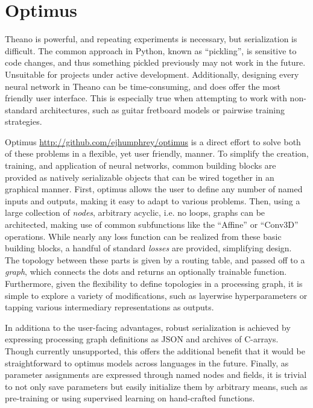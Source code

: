 \section{Optimus}
\label{sec:optimus}

Theano is powerful, and repeating experiments is necessary, but serialization is difficult.
The common approach in Python, known as ``pickling'', is sensitive to code changes, and thus something pickled previously may not work in the future.
Unsuitable for projects under active development.
Additionally, designing every neural network in Theano can be time-consuming, and does offer the most friendly user interface.
This is especially true when attempting to work with non-standard architectures, such as guitar fretboard models or pairwise training strategies.

Optimus \url{http://github.com/ejhumphrey/optimus} is a direct effort to solve both of these problems in a flexible, yet user friendly, manner.
To simplify the creation, training, and application of neural networks, common building blocks are provided as natively serializable objects that can be wired together in an graphical manner.
First, optimus allows the user to define any number of named inputs and outputs, making it easy to adapt to various problems.
Then, using a large collection of \emph{nodes}, arbitrary acyclic, i.e. no loops, graphs can be architected, making use of common subfunctions like the ``Affine'' or ``Conv3D'' operations.
While nearly any loss function can be realized from these basic building blocks, a handful of standard \emph{losses} are provided, simplifying design.
The topology between these parts is given by a routing table, and passed off to a \emph{graph}, which connects the dots and returns an optionally trainable function.
Furthermore, given the flexibility to define topologies in a processing graph, it is simple to explore a variety of modifications, such as layerwise hyperparameters or tapping various intermediary representations as outputs.

In additiona to the user-facing advantages, robust serialization is achieved by expressing processing graph definitions as JSON and archives of C-arrays.
Though currently unsupported, this offers the additional benefit that it would be straightforward to optimus models across languages in the future.
Finally, as parameter assignments are expressed through named nodes and fields, it is trivial to not only save parameters but easily initialize them by arbitrary means, such as pre-training or using supervised learning on hand-crafted functions.


